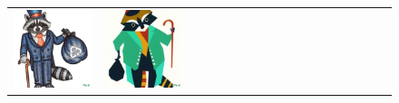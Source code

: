 \begin{figure}[ht!]
\begin{adjustwidth}{-0.8in}{-0.5in}
\begin{tabular}{cccccccccccccccccccc}
\multicolumn{2}{c}{\includegraphics[width=\threebythreecolwidth\textwidth]{figures/cherries/pointilism.jpg}} &
\multicolumn{2}{c}{\includegraphics[width=\threebythreecolwidth\textwidth]{figures/cherries/cubism.jpg}} &&

\end{tabular}
\end{adjustwidth}
\end{figure}
